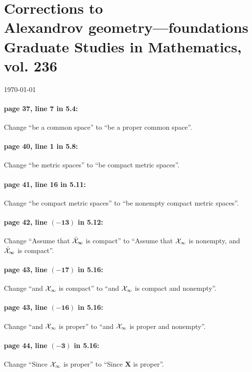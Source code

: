 \documentclass[twoside]{book}
\begin{document}
\pagestyle{empty}
\section*{Corrections to\\
Alexandrov geometry---foundations\\
{\normalsize Graduate Studies in Mathematics, vol. 236}
}

\today

\bigskip

\paragraph{page 37, line 7 in 5.4:}
Change ``be a common space'' to ``be a proper common space''.

\paragraph{page 40, line 1 in 5.8:} Change ``be metric spaces'' to ``be compact metric spaces''.

\paragraph{page 41, line 16 in 5.11:} Change ``be compact metric spaces'' to ``be nonempty compact metric spaces''.

\paragraph{page 42, line \(\bm{(-13)}\) in 5.12:} Change ``Assume that $\bar{\mathcal{X}}_\infty$ is compact'' to ``Assume that $\mathcal{X}_\infty$ is nonempty, and $\bar{\mathcal{X}}_\infty$ is compact''.

\paragraph{page 43, line \(\bm{(-17)}\) in 5.16:} Change ``and $\mathcal{X}_\infty$ is compact'' to ``and $\mathcal{X}_\infty$ is compact and nonempty''.

\paragraph{page 43, line \(\bm{(-16)}\) in 5.16:} Change ``and $\mathcal{X}_\infty$ is proper'' to ``and $\mathcal{X}_\infty$ is proper and nonempty''.

\paragraph{page 44, line \(\bm{(-3)}\) in 5.16:} Change ``Since $\mathcal{X}_\infty$ is proper'' to ``Since $\bm{X}$ is proper''.
\end{document}
